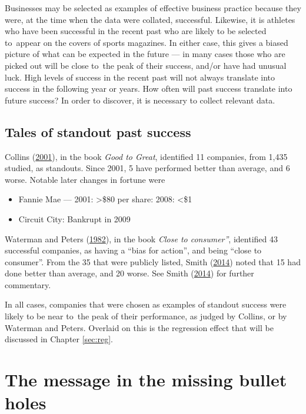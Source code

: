 \documentclass[
  10pt,
  b5paper]{book}
\providecommand{\tightlist}{%
  \setlength{\itemsep}{0pt}\setlength{\parskip}{0pt}}
\begin{document}
Businesses may be selected as examples of effective business
practice because they were, at the time when the data were
collated, successful. Likewise, it is athletes who have
been successful in the recent past who are likely to be
selected to~appear on the covers of sports magazines.
In either case, this gives a biased picture of what can be
expected in the future --- in many cases those who are
picked out will be close to~the peak of their success,
and/or have had unusual luck. High levels of success in
the recent past will not always translate into success
in the following year or years. How often will past
success translate into future success? In order to
discover, it is necessary to collect relevant data.

\hypertarget{tales-of-standout-past-success}{%
\subsection*{Tales of standout past success}\label{tales-of-standout-past-success}}

Collins (\protect\hyperlink{ref-collins_2001}{2001}), in the book \emph{Good to Great}, identified
11 companies, from 1,435 studied, as standouts. Since 2001,
5 have performed better than average, and 6 worse.
Notable later changes in fortune were

\begin{itemize}
\tightlist
\item
  Fannie Mae --- 2001: \textgreater\$80 per share: 2008: \textless\$1
\item
  Circuit City: Bankrupt in 2009
\end{itemize}

Waterman and Peters (\protect\hyperlink{ref-waterman1982search}{1982}), in the book \emph{Close to consumer''},
identified 43 successful companies, as having a ``bias for action'',
and being ``close to consumer''. From the 35 that were publicly listed,
Smith (\protect\hyperlink{ref-smith-sd}{2014}) noted that 15 had done better than average, and 20 worse.
See Smith (\protect\hyperlink{ref-smith-sd}{2014}) for further commentary.

In all cases, companies that were chosen as examples of
standout success were likely to be near to~the peak of
their performance, as judged by Collins, or by Waterman and Peters.
Overlaid on this is the regression effect that will be discussed
in Chapter \ref{sec:reg}.

\hypertarget{ss:wald}{%
\section{The message in the missing bullet holes}\label{ss:wald}}
\end{document}
